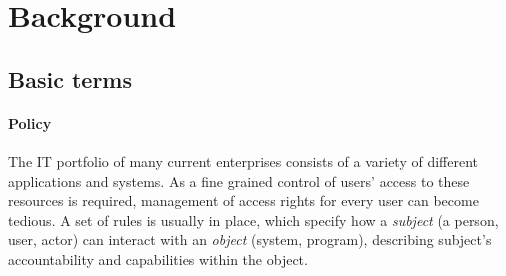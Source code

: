 \section{Background}


\subsection{Basic terms}

\paragraph{Policy}

The IT portfolio of many current enterprises consists of a variety of different applications and systems. As a fine grained control of users' access to these resources is required, management of access rights for every user can become tedious. A set of rules is usually in place, which specify how a \textit{subject} (a person, user, actor) can interact with an \textit{object} (system, program), describing subject's accountability and capabilities within the object.



